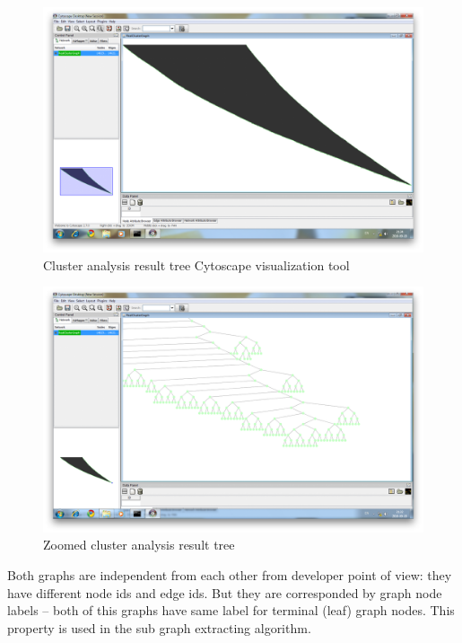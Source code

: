 \begin{figure}[h!]
\centering
\includegraphics[scale=0.25]{pictures/Cytoscape_cluster_graph_1.png}
\caption{Cluster analysis result tree Cytoscape visualization tool}
\label{fig:Cytoscape_Cluster_1}
\end{figure}

\begin{figure}[h!]
\centering
\includegraphics[scale=0.25]{pictures/Cytoscape_cluster_graph_2.png}
\caption{Zoomed cluster analysis result tree}
\label{fig:Cytoscape_Cluster_2}
\end{figure}

Both graphs are independent from each other from developer point of view: they have different node ids and edge ids. But they are corresponded by graph node labels -- both of this graphs have same label for terminal (leaf) graph nodes. This property is used in the sub graph extracting algorithm.


